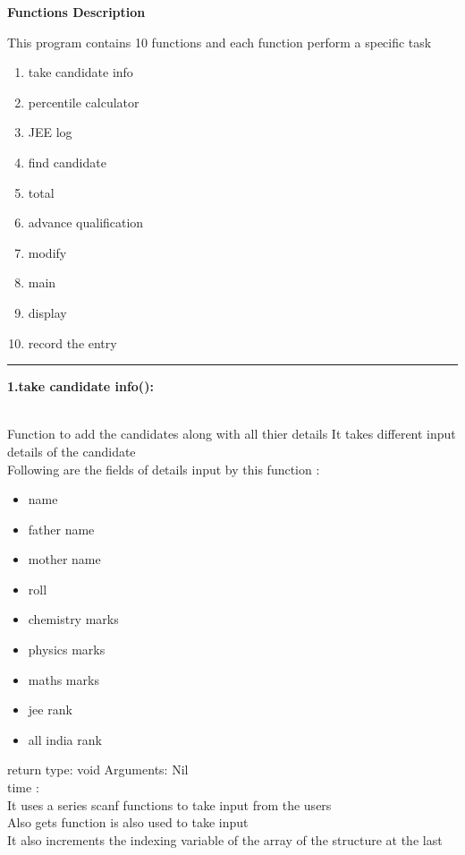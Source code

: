 \documentclass{article}
\begin{document}
\begin{center}
\textbf{{\Large Functions Description}}
\end{center}
\vspace{5mm}
{\large This program contains 10 functions and each function perform a specific task }
    \begin{enumerate}
       \item {\large take candidate info }
       \item {\large percentile calculator }
       \item {\large JEE log }
       \item {\large find candidate }
       \item {\large total }
       \item {\large advance qualification }
       \item {\large modify }
       \item {\large main }
       \item {\large display }
       \item {\large record the entry }
    \end{enumerate}
\par\noindent\rule{\textwidth}{0.4pt}
\vspace{5mm}
{\Large \textbf{1.take candidate info():}} \\
\\
{\large  Function to add the candidates along with all thier details
 It takes different input details of the candidate\\
 \vspace{5mm}
Following are the fields of details input by this function : \\
 \begin{itemize}
    \item name
    \item father name
    \item mother name
    \item roll
    \item chemistry marks
    \item physics marks
    \item maths marks
    \item jee rank
    \item all india rank
 \end{itemize}
 return type: void  \hspace{5mm}  Arguments: Nil\\
 time :\\
 It uses a series scanf functions to take input from the users\\
 Also gets function is also used to take input\\
 It also increments the indexing variable of the array of the structure at the last
 
 }
\end{document}
